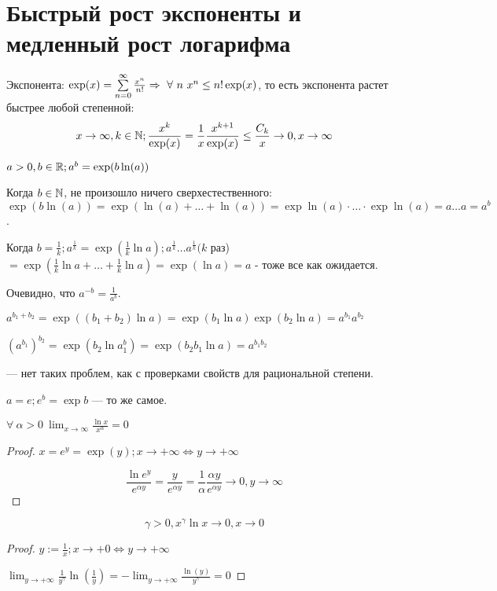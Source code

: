 \documentclass[12pt]{report}
\begin{document}
\section{Быстрый рост экспоненты и медленный рост логарифма}

Экспонента:
$\exp(x) = \sum\limits_{n = 0}^\infty{\frac{x^n}{n!}} \Rightarrow ~\forall ~n ~x^n \le n! \exp(x)$, то есть экспонента растет быстрее любой степенной:
$$x \to \infty, k \in \mathbb{N}; \frac{x^k}{\exp(x)} = \frac{1}{x}\frac{x^{k + 1}}{\exp(x)} \le \frac{C_k}{x} \to 0, x \to \infty$$

\begin{defn}
$a > 0, b \in \mathbb{R}; a^b = \exp(b\ln(a))$

Когда $b \in \mathbb{N}$, не произошло ничего сверхестественного:
$\exp(b\ln(a)) = \exp(\ln(a) + \dots + \ln(a)) = \exp{\ln(a)} \cdot \dots \cdot \exp{\ln(a)} = a \dots a = a^b$.

Когда $b = \frac{1}{k}; a^\frac{1}{k} = \exp(\frac{1}{k}\ln{a}); a^\frac{1}{k} \dots a^\frac{1}{k} (k$ раз) $= \exp(\frac{1}{k}\ln{a} + \dots + \frac{1}{k}\ln{a}) = \exp(\ln{a}) = a$ - тоже все как ожидается.

Очевидно, что $a^{-b} = \frac{1}{a^b}$.

$a^{b_1 + b_2} = \exp{((b_1 + b_2)\ln{a})} = \exp{(b_1\ln{a})}\exp{(b_2\ln{a})} = a^{b_1}a^{b_2}$

$\left(a^{b_1}\right)^{b_2} = \exp(b_2\ln{a^b_1}) = \exp(b_2b_1\ln{a}) = a^{b_1b_2}$

 --- нет таких проблем, как с проверками свойств для рациональной степени.
 
$a = e; e^b = \exp{b}$ --- то же самое.
\end{defn}

\begin{st}
$\forall ~\alpha > 0 ~\lim_{x \to \infty}{\frac{\ln{x}}{x^\alpha}} = 0$
\end{st}
\begin{proof}
$x = e^y = \exp(y); x \to +\infty \Leftrightarrow y \to +\infty$

$$\frac{\ln{e^y}}{e^{\alpha y}} = \frac{y}{e^{\alpha y}} = \frac{1}{\alpha} \frac{\alpha y}{e^{\alpha y}} \to 0, y \to \infty$$
\end{proof}

\begin{st}
$$\gamma > 0, x^\gamma \ln{x} \to 0, x \to 0$$
\end{st}
\begin{proof}
$y := \frac{1}{x}; x \to +0 \Leftrightarrow y \to +\infty$

$\lim_{y \to +\infty}{\frac{1}{y^\gamma}\ln(\frac{1}{y})} = -\lim_{y \to +\infty}{\frac{\ln(y)}{y^\gamma}} = 0$
\end{proof}
\end{document}
